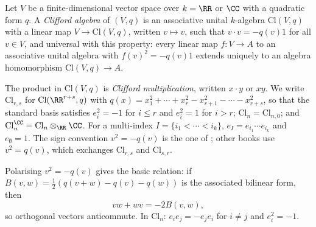 \begin{definition}\label{spin-geometry:definition-clifford-algebra}
Let $V$ be a finite-dimensional vector space over $k = \RR$ or $\CC$ with a quadratic form $q$. A \emph{Clifford algebra} of $(V, q)$ is an associative unital $k$-algebra $\mathrm{Cl}(V, q)$ with a linear map
$V \to \mathrm{Cl}(V, q)$, written $v \mapsto v$, such that $v \cdot v = -q(v)1$ for all $v \in V$, and universal with this property: every linear map $f \colon V \to A$ to an associative unital algebra with
$f(v)^2 = -q(v)1$ extends uniquely to an algebra homomorphism $\mathrm{Cl}(V, q) \to A$.
\end{definition}

\begin{notation}\label{spin-geometry:notation-clifford}
The product in $\mathrm{Cl}(V, q)$ is \emph{Clifford multiplication}, written $x \cdot y$ or $xy$. We write $\mathrm{Cl}_{r,s}$ for $\mathrm{Cl}(\RR^{r+s}, q)$ with
$q(x) = x_1^2 + \cdots + x_r^2 - x_{r+1}^2 - \cdots - x_{r+s}^2$, so that the standard basis satisfies $e_i^2 = -1$ for $i \leq r$ and $e_i^2 = 1$ for $i > r$; $\mathrm{Cl}_n = \mathrm{Cl}_{n,0}$; and
$\mathrm{Cl}^\CC_n = \mathrm{Cl}_n \otimes_\RR \CC$. For a multi-index $I = \{i_1 < \cdots < i_k\}$, $e_I = e_{i_1}\cdots e_{i_k}$ and $e_\emptyset = 1$. The sign convention $v^2 = -q(v)$ is the one of
\cite{lawson-michelsohn}; other books use $v^2 = q(v)$, which exchanges $\mathrm{Cl}_{r,s}$ and $\mathrm{Cl}_{s,r}$.
\end{notation}

Polarising $v^2 = -q(v)$ gives the basic relation: if $B(v, w) = \frac12(q(v + w) - q(v) - q(w))$ is the associated bilinear form, then
\begin{equation}\label{spin-geometry:equation-clifford-relation}
vw + wv = -2B(v, w),
\end{equation}
so orthogonal vectors anticommute. In $\mathrm{Cl}_n$: $e_ie_j = -e_je_i$ for $i \neq j$ and $e_i^2 = -1$.


